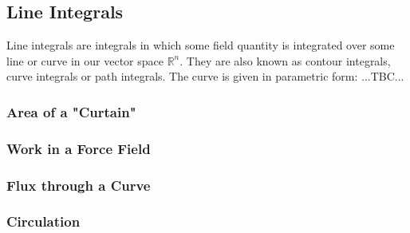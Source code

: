 



\subsection{Line Integrals}
Line integrals are integrals in which some field quantity is integrated over some line or curve in our vector space $\mathbb{R}^n$. They are also known as contour integrals, curve integrals or path integrals. The curve is given in parametric form:
...TBC...



\subsubsection{Area of a "Curtain"}



\subsubsection{Work in a Force Field}


\subsubsection{Flux through a Curve}


\subsubsection{Circulation}



